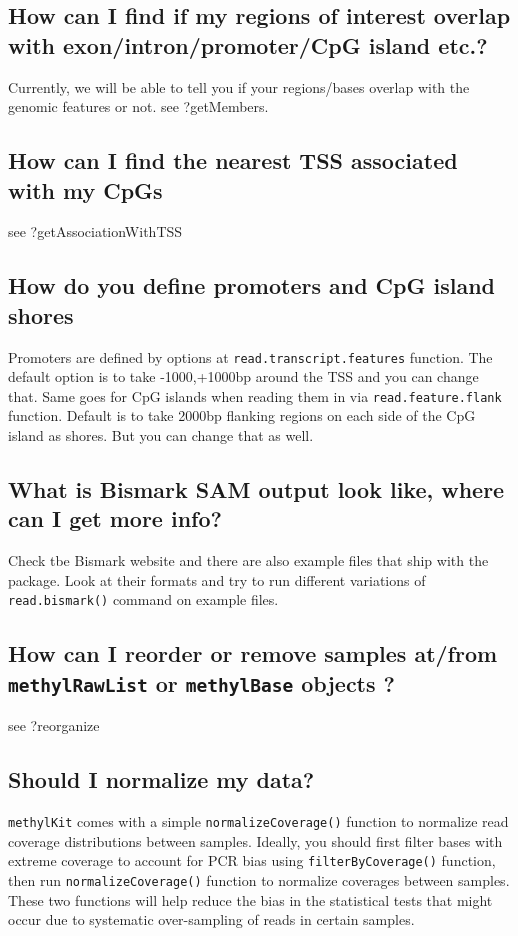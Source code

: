 \documentclass{article}
\begin{document}
\subsection{How can I find if my regions of interest overlap with 
exon/intron/promoter/CpG island etc.?}
Currently, we will be able to tell you if your regions/bases overlap with
the genomic features or not. 
see ?getMembers. 

\subsection{How can I find the nearest TSS associated with my CpGs}
see ?getAssociationWithTSS

\subsection{How do you define promoters and CpG island shores}
Promoters are defined by options at \texttt{read.transcript.features} function. 
The default option is to take -1000,+1000bp around the TSS and you can change that. 
Same goes for CpG islands when reading them in via \texttt{read.feature.flank} function. 
Default is to take 2000bp flanking regions on each side of the CpG island as shores. 
But you can change that as well.

\subsection{What is Bismark SAM output look like, where can I get more info?}
Check tbe Bismark website and there are  also example files that ship with the 
package. Look at their formats and try to run different variations of 
\texttt{read.bismark()} command on example files.

\subsection{How can I reorder or remove samples at/from  \texttt{methylRawList} or \texttt{methylBase} objects ?}
see ?reorganize

\subsection{Should I normalize my data?}
\texttt{methylKit} comes with a simple \texttt{normalizeCoverage()} function to normalize read 
coverage distributions between samples. Ideally, you should first filter bases
with extreme coverage to account for PCR bias using \texttt{filterByCoverage()}
function, then run \texttt{normalizeCoverage()} function to normalize coverages
between samples. These two functions will help reduce the bias in the statistical
tests that might occur due to systematic over-sampling of reads in certain samples.
\end{document}

